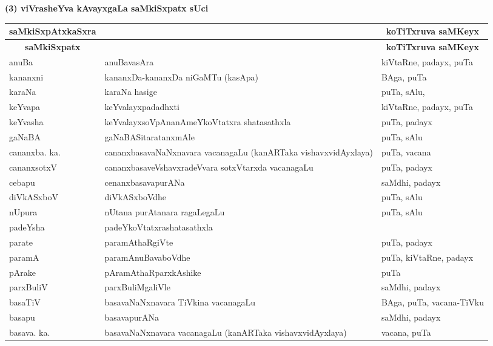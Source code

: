\vskip 1cm

\begin{center}
{\large\bf (3) viVrasheYva kAvayxgaLa saMkiSxpatx sUci}
\end{center}

{\renewcommand{\arraystretch}{1.35}
\begin{longtable}{l>{\raggedright}p{5cm}l}
\hline
\multicolumn{1}{c}{\bf saMkiSxpAtxkaSxra} & \multicolumn{1}{c}{\bf kaqtiya hesaru} & \multicolumn{1}{c}{\bf koTiTxruva saMKeyx}\\
\hline
\endfirsthead
\hline
\multicolumn{1}{c}{\bf saMkiSxpatx} & \multicolumn{1}{c}{\bf kaqtiya hesaru} & \multicolumn{1}{c}{\bf koTiTxruva saMKeyx}\\
\hline
\endhead
\hline
\endfoot
\endlastfoot
anuBa & anuBavasAra &  kiVtaRne, padayx, puTa\\
kananxni & kananxDa-kananxDa niGaMTu (kasApa) & BAga, puTa\\
karaNa & karaNa hasige & puTa, sAlu,\\
keYvapa & keYvalayxpadadhxti &  kiVtaRne, padayx, puTa\\
keYvasha & keYvalayxsoVpAnanAmeYkoVtatxra shatasathxla & puTa, padayx\\
gaNaBA & gaNaBASitaratanxmAle & puTa, sAlu\\
cananxba. ka. & cananxbasavaNaNxnavara vacanagaLu (kanARTaka vishavxvidAyxlaya) & puTa, vacana\\
cananxsotxV & cananxbasaveVshavxradeVvara sotxVtarxda vacanagaLu & puTa, padayx\\
cebapu & cenanxbasavapurANa & saMdhi, padayx\\
diVkASxboV & diVkASxboVdhe & puTa, sAlu\\
nUpura & nUtana purAtanara ragaLegaLu & puTa, sAlu\\
padeYsha & padeYkoVtatxrashatasathxla & \\
parate & paramAthaRgiVte & puTa, padayx\\
paramA & paramAnuBavaboVdhe & puTa, kiVtaRne, padayx\\
pArake & pAramAthaRparxkAshike & puTa\\
parxBuliV & parxBuliMgaliVle & saMdhi, padayx\\
basaTiV & basavaNaNxnavara TiVkina vacanagaLu & BAga, puTa, vacana-TiVku\\
basapu & basavapurANa & saMdhi, padayx\\
basava. ka. & basavaNaNxnavara vacanagaLu (kanARTaka vishavxvidAyxlaya) & vacana, puTa\\

\end{longtable}}
